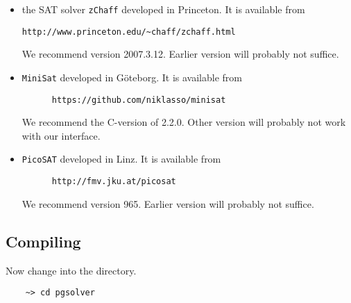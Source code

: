 	\begin{itemize}
  	\item the SAT solver \texttt{zChaff} developed in Princeton. It is available from
    \begin{verbatim}
http://www.princeton.edu/~chaff/zchaff.html\end{verbatim}
  We recommend version 2007.3.12. Earlier version will probably not suffice.

        \item \texttt{MiniSat} developed in G\"oteborg. It is available from
        \begin{verbatim}
      https://github.com/niklasso/minisat\end{verbatim}
        We recommend the C-version of 2.2.0. Other version will probably not
        work with our interface.

        \item \texttt{PicoSAT} developed in Linz. It is available from
        \begin{verbatim}
      http://fmv.jku.at/picosat\end{verbatim}
        We recommend version 965. Earlier version will probably not suffice.

    \end{itemize}



\subsection{Compiling \pgsolver}

Now change into the \pgsolver directory.
\begin{verbatim}
    ~> cd pgsolver
\end{verbatim}

